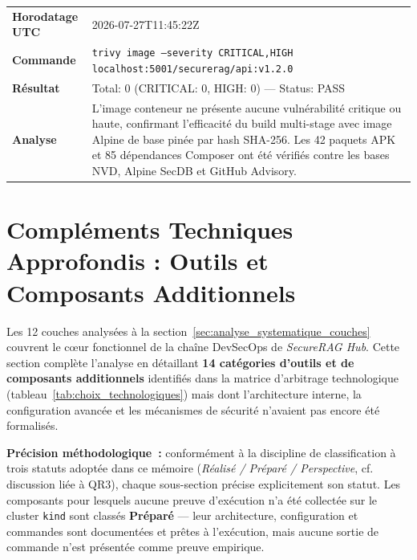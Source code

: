 \begin{tcolorbox}[colback=LightGray, colframe=clrBlue,
    title={\small\bfseries Preuve \#5 — Scan Trivy Image conteneur (Extrait Audit)}]
\footnotesize
\begin{tabular}{@{}p{3cm}p{10cm}@{}}
\textbf{Horodatage UTC} & 2026-07-27T11:45:22Z \\
\textbf{Commande} & \texttt{trivy image --severity CRITICAL,HIGH localhost:5001/securerag/api:v1.2.0} \\
\textbf{Résultat} & Total: 0 (CRITICAL: 0, HIGH: 0) — Status: PASS \\
\textbf{Analyse} & L'image conteneur ne présente aucune vulnérabilité critique ou haute, confirmant l'efficacité du build multi-stage avec image Alpine de base pinée par hash SHA-256. Les 42 paquets APK et 85 dépendances Composer ont été vérifiés contre les bases NVD, Alpine SecDB et GitHub Advisory. \\
\end{tabular}
\end{tcolorbox}


\section{Compléments Techniques Approfondis : Outils et Composants Additionnels}
\label{sec:complements_techniques}

Les 12 couches analysées à la section~\ref{sec:analyse_systematique_couches} couvrent le cœur fonctionnel de la chaîne DevSecOps de \textit{SecureRAG Hub}. Cette section complète l'analyse en détaillant \textbf{14 catégories d'outils et de composants additionnels} identifiés dans la matrice d'arbitrage technologique (tableau~\ref{tab:choix_technologiques}) mais dont l'architecture interne, la configuration avancée et les mécanismes de sécurité n'avaient pas encore été formalisés.

\textbf{Précision méthodologique~:} conformément à la discipline de classification à trois statuts adoptée dans ce mémoire (\textit{Réalisé / Préparé / Perspective}, cf. discussion liée à QR3), chaque sous-section précise explicitement son statut. Les composants pour lesquels aucune preuve d'exécution n'a été collectée sur le cluster \texttt{kind} sont classés \textbf{Préparé} — leur architecture, configuration et commandes sont documentées et prêtes à l'exécution, mais aucune sortie de commande n'est présentée comme preuve empirique.

